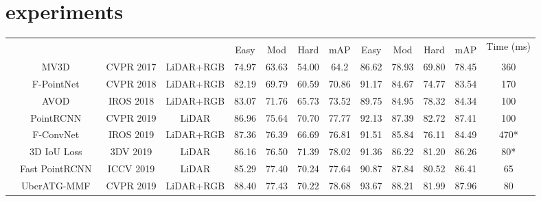 \documentclass[letterpaper]{article}
\begin{document}
\else
\chapter{experiments}
\fi

\begin{table*}[t]
   \centering
   \footnotesize
\begin{tabular}{c|c|c|c|cccc|cccc|c}
       \hline
       &
       \multicolumn{1}{c|}{ \multirow{2}{*}{Method}} & \multicolumn{1}{c|}{ \multirow{2}{*}{Reference}}& \multicolumn{1}{c|}{ \multirow{2}{*}{Modality}} & \multicolumn{4}{|c|}{} & \multicolumn{4}{|c|}{} & \multicolumn{1}{|c}{\multirow{2}{*}{Time (ms)}} \\
       \cline{5-12}
       &
       \multicolumn{1}{c|}{} & \multicolumn{1}{c|}{} & \multicolumn{1}{c|}{}& \multicolumn{1}{|c}{Easy} & \multicolumn{1}{c}{Mod} & \multicolumn{1}{c}{Hard} & \multicolumn{1}{c|}{mAP} &
       \multicolumn{1}{|c}{Easy} & \multicolumn{1}{c}{Mod} & \multicolumn{1}{c}{Hard} & \multicolumn{1}{c|}{mAP} & \multicolumn{1}{|c}{} \\
       \hline
       \hline
         \parbox[t]{2mm}{}
& MV3D~\cite{MV3D}     &CVPR 2017   & {LiDAR+RGB}   & 74.97  & 63.63  & 54.00 &64.2 &86.62 &78.93 &69.80 &78.45 & 360\\
         & F-PointNet~\cite{FPOINTNET} &CVPR 2018   & {LiDAR+RGB}   & 82.19  & 69.79  & 60.59 &70.86 &91.17 &84.67 &74.77 &83.54 & 170\\
         & AVOD~\cite{AVOD}            &IROS 2018   & {LiDAR+RGB}   & 83.07  & 71.76  & 65.73 &73.52 &89.75 &84.95 &78.32 &84.34 & 100\\
& PointRCNN~\cite{shi2019pointrcnn} &CVPR 2019   & {LiDAR}     & 86.96  & 75.64  & 70.70 &77.77 &92.13 &87.39 &82.72 & 87.41 & 100\\
         & F-ConvNet~\cite{wang2019frustum}  &IROS 2019   & {LiDAR+RGB}   & 87.36  & 76.39  & 66.69 &76.81 &91.51 &85.84 &76.11 &84.49 & 470*\\
         & 3D IoU Loss~\cite{zhou2019iou}    &3DV 2019   & {LiDAR}     & 86.16  & 76.50  & 71.39 &78.02 &91.36  &86.22  &81.20  &86.26 & 80*\\
& Fast PointRCNN~\cite{Chen2019fastpointrcnn} &ICCV 2019   & {LiDAR}     & 85.29  & 77.40  & 70.24 &77.64 &90.87 &87.84 &80.52 &86.41 & 65\\
         & UberATG-MMF~\cite{liang2019multi} &CVPR 2019   & {LiDAR+RGB}   & 88.40  & 77.43  & 70.22 &78.68 &93.67 &88.21 &81.99 &87.96 & 80\\

\end{tabular}
\end{table*}
\end{document}
